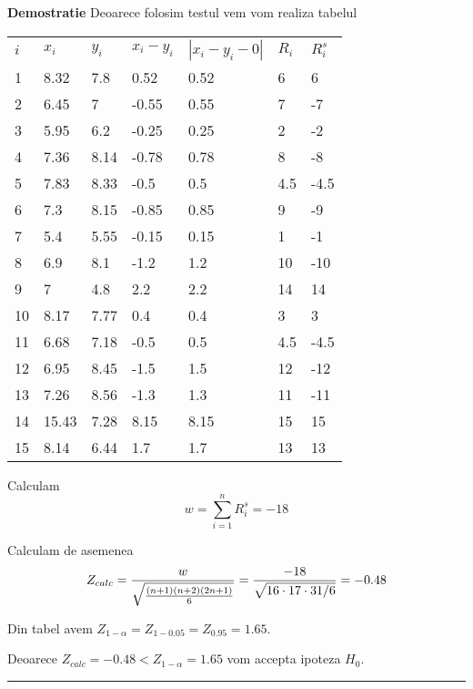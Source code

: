 \documentclass{article}
\newenvironment{proof}[1][Proof]{\noindent\textbf{Demostratie} }{\ \rule{0.5em}{0.5em}}
\begin{document}
\begin{proof}
Deoarece folosim testul vem vom realiza tabelul

\begin{tabular}{lllllll}
$i$ & $x_{i}$ & $y_{i}$ & $x_{i}-y_{i}$ & $\left\vert
x_{i}-y_{i}-0\right\vert $ & $R_{i}$ & $R_{i}^{s}$ \\ 
1 & 8.32 & 7.8 & 0.52 & 0.52 & 6 & 6 \\ 
2 & 6.45 & 7 & -0.55 & 0.55 & 7 & -7 \\ 
3 & 5.95 & 6.2 & -0.25 & 0.25 & 2 & -2 \\ 
4 & 7.36 & 8.14 & -0.78 & 0.78 & 8 & -8 \\ 
5 & 7.83 & 8.33 & -0.5 & 0.5 & 4.5 & -4.5 \\ 
6 & 7.3 & 8.15 & -0.85 & 0.85 & 9 & -9 \\ 
7 & 5.4 & 5.55 & -0.15 & 0.15 & 1 & -1 \\ 
8 & 6.9 & 8.1 & -1.2 & 1.2 & 10 & -10 \\ 
9 & 7 & 4.8 & 2.2 & 2.2 & 14 & 14 \\ 
10 & 8.17 & 7.77 & 0.4 & 0.4 & 3 & 3 \\ 
11 & 6.68 & 7.18 & -0.5 & 0.5 & 4.5 & -4.5 \\ 
12 & 6.95 & 8.45 & -1.5 & 1.5 & 12 & -12 \\ 
13 & 7.26 & 8.56 & -1.3 & 1.3 & 11 & -11 \\ 
14 & 15.43 & 7.28 & 8.15 & 8.15 & 15 & 15 \\ 
15 & 8.14 & 6.44 & 1.7 & 1.7 & 13 & 13%
\end{tabular}

Calculam%
\[
w=\sum_{i=1}^{n}R_{i}^{s}=-18
\]

Calculam de asemenea%
\[
Z_{calc}=\frac{w}{\sqrt{\frac{(n+1)(n+2)(2n+1)}{6}}}=\frac{-18}{\sqrt{%
16\cdot 17\cdot 31/6}}=-0.48
\]

Din tabel avem $Z_{1-\alpha }=Z_{1-0.05}=Z_{0.95}=1.65$.

Deoarece $Z_{calc}=-0.48<Z_{1-\alpha }=1.65$ vom accepta ipoteza $H_{0}$.
\end{proof}
\end{document}
